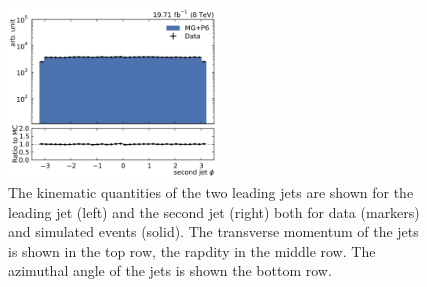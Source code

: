 \begin{figure}[htbp]
    \includegraphics[width=0.49\textwidth]{figures/measurement/jet_quantities_jet2phi.pdf}
    \caption[Kinematic quantities of the jets]{The 
        kinematic quantities of the two leading jets are shown for the leading
        jet (left) and the second jet (right) both for data (markers) and
        simulated events (solid). The transverse momentum of the
        jets is shown in the top row, the rapdity in the middle row. The
        azimuthal angle of the jets is shown the bottom row.}
    \label{fig:controlplots:kinematic}
\end{figure}

